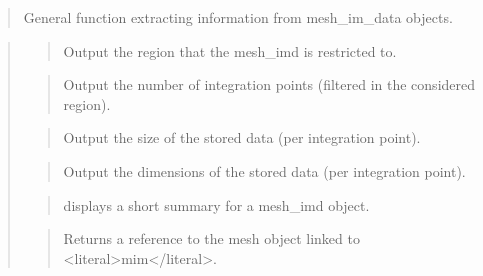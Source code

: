\documentclass[a4paper,11pt,english]{sphinxmanual}
\begin{document}
\sphinxAtStartPar
{}
\begin{quote}

\sphinxAtStartPar
General function extracting information from mesh\_im\_data objects.
\end{quote}

\sphinxAtStartPar
{}
\begin{quote}

\sphinxAtStartPar
{}
\begin{quote}

\sphinxAtStartPar
Output the region that the mesh\_imd is restricted to.
\end{quote}

\sphinxAtStartPar
{}
\begin{quote}

\sphinxAtStartPar
Output the number of integration points (filtered in the considered region).
\end{quote}

\sphinxAtStartPar
{}
\begin{quote}

\sphinxAtStartPar
Output the size of the stored data (per integration point).
\end{quote}

\sphinxAtStartPar
{}
\begin{quote}

\sphinxAtStartPar
Output the dimensions of the stored data (per integration point).
\end{quote}

\sphinxAtStartPar
{}
\begin{quote}

\sphinxAtStartPar
displays a short summary for a mesh\_imd object.
\end{quote}

\sphinxAtStartPar
{}
\begin{quote}

\sphinxAtStartPar
Returns a reference to the mesh object linked to \textless{}literal\textgreater{}mim\textless{}/literal\textgreater{}.
\end{quote}
\end{quote}
\end{document}
